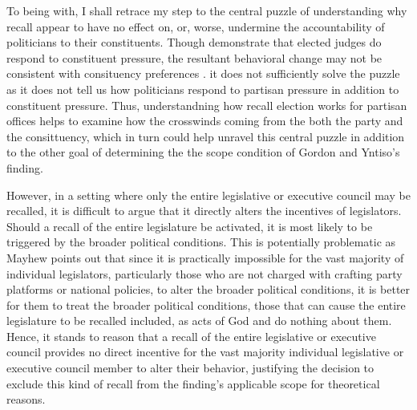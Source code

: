 \documentclass[hyphens, crop=false]{standalone}
\begin{document}
		To being with,
		I shall retrace my step to the central puzzle of understanding why
		recall appear to have no effect on,
		or, worse, undermine the accountability of politicians to their constituents.
		Though
		\citeauthor{gordonIncentiveEffectsRecall2021a}
		\autocite*{gordonIncentiveEffectsRecall2021a}
		demonstrate that elected judges do respond to constituent pressure,
		the resultant behavioral change may not be consistent with consituency preferences .
		it does not sufficiently solve the puzzle as
		it does not tell us how politicians respond to partisan pressure in addition to constituent pressure.
		Thus,
		understandning how recall election works for partisan offices helps to examine how
		the crosswinds coming from the both the party and the consittuency,
		which in turn
		could help unravel this central puzzle
		in addition to the other goal of
		determining the
		the scope condition of
		Gordon and Yntiso's
		finding.
		
		However,
		in a setting where only
		the entire
		legislative or executive council may be recalled,
		it is difficult to argue that it directly alters the incentives of legislators.
		Should a recall of the entire legislature
		be activated,
		it is most likely to be triggered by
		the broader political conditions.
		This is potentially problematic as
		Mayhew
		\autocite*{mayhewCongressElectoralConnection1974}
		points out that since
		it is practically impossible for the vast majority of
		individual legislators,
		particularly those who are not charged with crafting party platforms or national policies,
		to alter the broader political conditions,
		it is better for them to treat the broader political conditions,
		those that can cause the entire legislature to be recalled included,
		as acts of God and do nothing about them.
		Hence, it stands to reason that a recall of the entire legislative or executive council
		provides no direct incentive for the vast majority individual legislative or executive council member
		to alter their behavior,
		justifying the decision to exclude this kind of recall from the finding's applicable scope for theoretical reasons.
\end{document}
